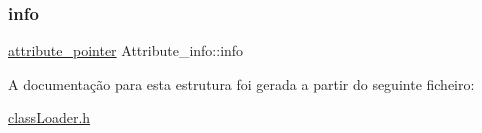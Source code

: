 \hypertarget{struct_attribute__info_af50e221b11ed1b84edbee3a06940b8eb}{}\label{struct_attribute__info_af50e221b11ed1b84edbee3a06940b8eb} 
\subsubsection{\texorpdfstring{info}{info}}
{\footnotesize\ttfamily \hyperlink{unionattribute__pointer}{attribute\+\_\+pointer} Attribute\+\_\+info\+::info}



A documentação para esta estrutura foi gerada a partir do seguinte ficheiro\+:\begin{DoxyCompactItemize}
\item 
\hyperlink{class_loader_8h}{class\+Loader.\+h}\end{DoxyCompactItemize}
